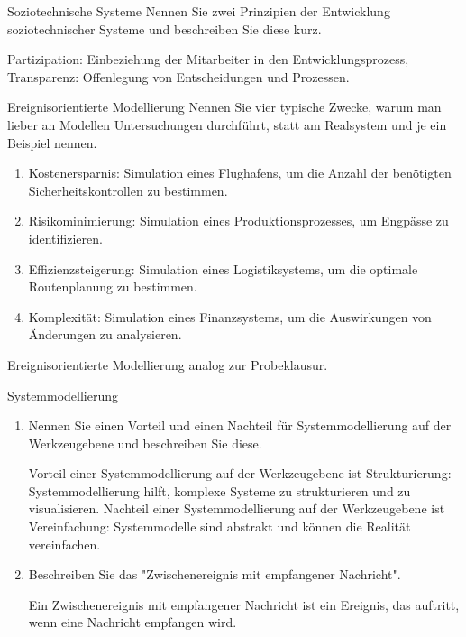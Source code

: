 \documentclass{article}
\begin{document}
\begin{exercise}{Soziotechnische Systeme}
  Nennen Sie zwei Prinzipien der Entwicklung soziotechnischer Systeme und beschreiben Sie diese kurz.

  \begin{solution}
    Partizipation: Einbeziehung der Mitarbeiter in den Entwicklungsprozess, Transparenz: Offenlegung von Entscheidungen und Prozessen.
  \end{solution}
\end{exercise}



\begin{exercise}{Ereignisorientierte Modellierung}
  Nennen Sie vier typische Zwecke, warum man lieber an Modellen Untersuchungen durchführt, statt am Realsystem und je ein Beispiel nennen.
  \begin{solution}
    \begin{enumerate}
      \item Kostenersparnis: Simulation eines Flughafens, um die Anzahl der benötigten Sicherheitskontrollen zu bestimmen.
      \item Risikominimierung: Simulation eines Produktionsprozesses, um Engpässe zu identifizieren.
      \item Effizienzsteigerung: Simulation eines Logistiksystems, um die optimale Routenplanung zu bestimmen.
      \item Komplexität: Simulation eines Finanzsystems, um die Auswirkungen von Änderungen zu analysieren.
    \end{enumerate}
  \end{solution}

  Ereignisorientierte Modellierung analog zur Probeklausur.
\end{exercise}

\begin{exercise}{Systemmodellierung}
  \begin{enumerate}
    \item Nennen Sie einen Vorteil und einen Nachteil für Systemmodellierung auf der Werkzeugebene und beschreiben Sie diese.
          \begin{solution}
            Vorteil einer Systemmodellierung auf der Werkzeugebene ist Strukturierung: Systemmodellierung hilft, komplexe Systeme zu strukturieren und zu visualisieren. Nachteil einer Systemmodellierung auf der Werkzeugebene ist Vereinfachung: Systemmodelle sind abstrakt und können die Realität vereinfachen.
          \end{solution}
    \item Beschreiben Sie das "Zwischenereignis mit empfangener Nachricht".
          \begin{solution}
            Ein Zwischenereignis mit empfangener Nachricht ist ein Ereignis, das auftritt, wenn eine Nachricht empfangen wird.
          \end{solution}
  \end{enumerate}
\end{exercise}
\end{document}
